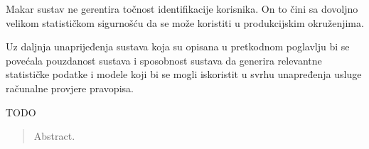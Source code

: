 \documentclass[times, utf8, zavrsni]{fer}
\begin{document}
Makar sustav ne gerentira točnost identifikacije korisnika. On to čini sa
dovoljno velikom statističkom sigurnošću da se može koristiti u produkcijskim
okruženjima.

Uz daljnja unaprijeđenja sustava koja su opisana u pretkodnom poglavlju bi
se povećala pouzdanost sustava i sposobnost sustava da generira relevantne
statističke podatke i modele koji bi se mogli iskoristit u svrhu unapređenja
usluge računalne provjere pravopisa.




\begin{sazetak}
TODO

\end{sazetak}

\begin{abstract}
Abstract.

\end{abstract}
\end{document}
